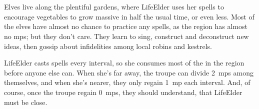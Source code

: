 \section{}

\begin{figure}[t!]
  \label{plateauGardens}
\end{figure}

Elves live along the plentiful gardens, where \gls{LifeElder} uses her spells to encourage vegetables to grow massive in half the usual time, or even less.
Most of the elves have almost no chance to practice any spells, as the \gls{region} has almost no \glspl{mp}; but they don't care.
They learn to sing, construct and deconstruct new ideas, then gossip about infidelities among local robins and kestrels.

\Gls{LifeElder} casts spells every \gls{interval}, so she consumes most of the  in the \gls{region} before anyone else can.
When she's far away, the troupe can divide 2~\glspl{mp} among themselves, and when she's nearer, they only regain 1~\gls{mp} each \gls{interval}.
And, of course, once the troupe regain 0~\glspl{mp}, they should understand, that \gls{LifeElder} must be close.

